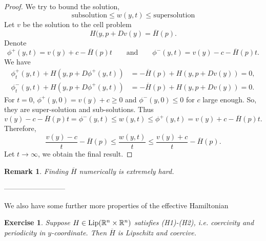\documentclass[12pt, oneside]{amsart}  	%
\newtheorem{remark}{Remark}
\newtheorem{exercise}{Exercise}
\begin{document}
\begin{proof}
We try to bound the solution, 
$$\text{subsolution} \le w(y,t) \le \text{supersolution}$$
Let $v$ be the solution to the cell problem
$$H(y, p+ Dv(y) = \overline{H}(p).$$
Denote 
\begin{equation*}
\phi^+(y,t)=v(y) + c -\overline{H}(p)t\qquad\text{and}\qquad\phi^-(y,t)=v(y) - c -\overline{H}(p)t.
\end{equation*}
We have
\begin{align*}
\phi^+_t(y,t) + H(y, p + D\phi^+(y,t))&= -\overline{H}(p) + H(y, p + Dv(y))=0,\\
\phi^-_t(y,t) + H(y, p + D\phi^+(y,t))&= -\overline{H}(p) + H(y, p + Dv(y))=0.
\end{align*}
For $t=0$, $\phi^+(y,0)=v(y)+c \ge 0$ and $\phi^-(y,0)\le 0$ for $c$ large enough. So, they are super-solution and sub-solutions. Thus
$$v(y)-c-\overline{H}(p)t = \phi^-(y,t) \le w(y,t) \le \phi^+(y,t) = v(y) + c -\overline{H}(p)t.$$
Therefore,
$$\frac{v(y)-c}{t}-\overline{H}(p)\le \frac{w(y,t)}{t} \le\frac{v(y)+c}{t}-\overline{H}(p).$$
Let $t\longrightarrow \infty$, we obtain the final result.
\end{proof}
\begin{remark}
Finding $\overline{H}$ numerically is extremely hard.
\end{remark}
--------------------------

We also have some further more properties of the effective Hamiltonian

\begin{exercise} \label{exercise4}
Suppose $H\in\text{Lip}(\mathbb{R}^n\times\mathbb{R}^n)$ satisfies (H1)-(H2), i.e. coercivity and periodicity in $y$-coordinate. Then $\overline{H}$ is Lipschitz and coercive. 
\end{exercise}











\end{document}

